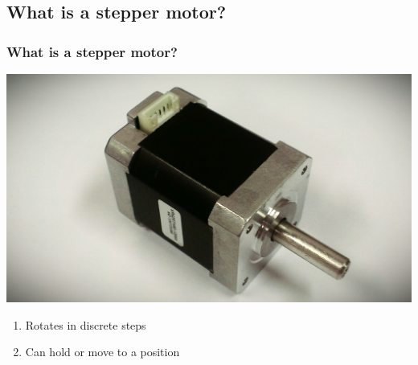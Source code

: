 \documentclass[table,10pt,red]{beamer}	%
\begin{document}
\subsection{What is a stepper motor?}
\begin{frame}
	\frametitle{What is a stepper motor?}
		\begin{minipage}[c]{0.6\textwidth}
			\includegraphics[width=\linewidth]{IMAG0758_1}
		\end{minipage}
	\pause
	\hfill
		\begin{minipage}[c]{0.3\textwidth}
			\begin{enumerate}
				\item <+-|alert@+> Rotates in discrete steps
				\item <+-|alert@+> Can hold or move to a position
			\end{enumerate}
		\end{minipage}   
\end{frame}
\end{document}
